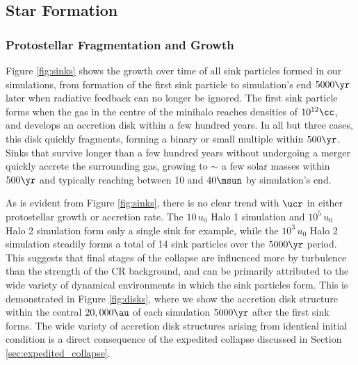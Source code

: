 \subsection{Star Formation}
\subsubsection{Protostellar Fragmentation and Growth}
\label{subsec:sink_formation}

Figure \ref{fig:sinks} shows the growth over time of all sink particles formed in our simulations, from formation of the first sink particle to simulation's end $5000\yr$ later when radiative feedback can no longer be ignored. 
The first sink particle forms when the gas in the centre of the minihalo reaches densities of $10^{12}\cc$, and develops an accretion disk within a few hundred years. 
In all but three cases, this disk quickly fragments, forming a binary or small multiple within $500\yr$. 
Sinks that survive longer than a few hundred years without undergoing a merger quickly accrete the surrounding gas, growing to $\sim$ a few solar masses within $500\yr$ and typically reaching between 10 and $40\msun$ by simulation's end.

As is evident from Figure \ref{fig:sinks}, there is no clear trend with $\ucr$ in either protostellar growth or accretion rate.
The $10\,u_0$ Halo 1 simulation and $10^5\,u_0$ Halo 2 simulation form only a single sink for example, while the $10^3\,u_0$ Halo 2 simulation steadily forms a total of 14 sink particles over the $5000\yr$ period.
This suggests that final stages of the collapse are influenced more by turbulence than the strength of the CR background, and can be primarily attributed to the wide variety of dynamical environments in which the sink particles form.
This is demonstrated in Figure \ref{fig:disks}, where we show the accretion disk structure within the central $20,000\au$ of each simulation $5000\yr$ after the first sink forms.
The wide variety of accretion disk structures arising from identical initial condition is a direct consequence of the expedited collapse discussed in Section \ref{sec:expedited_collapse}.